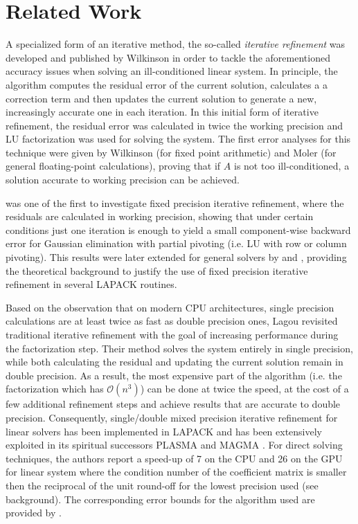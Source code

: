 \section{Related Work}
\label{sec:related_work}

A specialized form of an iterative method, the so-called \textit{iterative refinement} was developed and published by Wilkinson \cite{wilkinson_rounding_1963} in order to tackle the aforementioned accuracy issues when solving an ill-conditioned linear system. In principle, the algorithm computes the residual error of the current solution, calculates a a correction term and then updates the current solution to generate a new, increasingly accurate one in each iteration. In this initial form of iterative refinement, the residual error was calculated in twice the working precision and LU factorization was used for solving the system. The first error analyses for this technique were given by Wilkinson \cite{wilkinson_rounding_1963} (for fixed point arithmetic) and Moler \cite{moler_iterative_1967} (for general floating-point calculations), proving that if $A$ is not too ill-conditioned, a solution accurate to working precision can be achieved.

\cite{skeel_iterative_1980} was one of the first to investigate fixed precision iterative refinement, where the residuals are calculated in working precision, showing that under certain conditions just one iteration is enough to yield a small component-wise backward error for Gaussian elimination with partial pivoting (i.e. LU with row or column pivoting). This results were later extended for general solvers by \cite{higham_iterative_1991} and \cite{higham_iterative_1997}, providing the theoretical background to justify the use of fixed precision iterative refinement in several LAPACK \cite{anderson_lapack_1999} routines.

Based on the observation that on modern CPU architectures, single precision calculations are at least twice as fast as double precision ones, Lagou \cite{langou_exploiting_2006} revisited traditional iterative refinement with the goal of increasing performance during the factorization step. Their method solves the system entirely in single precision, while both calculating the residual and updating the current solution remain in double precision. As a result, the most expensive part of the algorithm (i.e. the factorization which has $\mathcal{O}(n^3)$) can be done at twice the speed, at the cost of a few additional refinement steps and achieve results that are accurate to double precision. Consequently, single/double mixed precision iterative refinement for linear solvers has been implemented in LAPACK \cite{anderson_lapack_1999} and has been extensively exploited in its spiritual successors PLASMA and MAGMA \cite{abdelfattah_linear_2016}. For direct solving techniques, the authors report a speed-up of 7 on the CPU and 26 on the GPU for linear system where the condition number of the coefficient matrix is smaller then the reciprocal of the unit round-off for the lowest precision used (see background). The corresponding error bounds for the algorithm used are provided by \cite{arioli_using_2008}.

